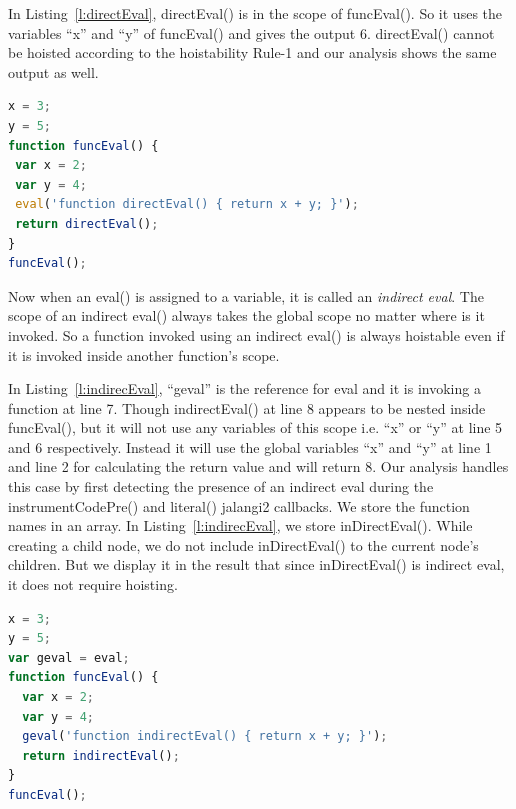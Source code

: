 \documentclass[authoryear,preprint]{sigplanconf}
\begin{document}
In Listing~\ref{l:directEval}, directEval() is in the scope of funcEval(). So it uses the variables \enquote{x} and \enquote{y} of funcEval() and gives the output 6.  directEval() cannot be hoisted according to the hoistability Rule-1 and our analysis shows the same output as well.

\lstset{numbers=left, numberstyle=\tiny, stepnumber=1, numbersep=5pt}
\lstset{basicstyle=\ttfamily}
\lstset{frame=tb, frame=bottomline}

\begin{lstlisting}[float,caption=Direct eval() ,label=l:directEval,language=JavaScript]
x = 3;
y = 5;
function funcEval() {
 var x = 2;
 var y = 4;
 eval('function directEval() { return x + y; }');
 return directEval();
}
funcEval();
\end{lstlisting}

Now when an eval() is assigned to a variable, it is called an \textit{indirect eval}. The scope of an indirect eval() always takes the global scope no matter where is it invoked. So a function invoked using an indirect eval() is always hoistable even if it is invoked inside another function's scope.\par

In Listing~\ref{l:indirecEval}, \enquote{geval} is the reference for eval and it is invoking a function at line 7. Though indirectEval() at line 8 appears to be nested inside funcEval(), but it will not use any variables of this scope i.e. \enquote{x} or \enquote{y} at line 5 and 6 respectively. Instead it will use the global variables \enquote{x} and \enquote{y} at line 1 and line 2 for calculating the return value and will return 8. Our analysis handles this case by first detecting the presence of an indirect eval during the instrumentCodePre() and literal() jalangi2 callbacks. We store the function names in an array. In Listing~\ref{l:indirecEval}, we store inDirectEval(). While creating a child node, we do not include inDirectEval() to the current node's children. But we display it in the result that since inDirectEval() is indirect eval, it does not require hoisting. 

\lstset{numbers=left, numberstyle=\tiny, stepnumber=1, numbersep=5pt}
\lstset{basicstyle=\ttfamily}
\lstset{frame=tb, frame=bottomline}

\begin{lstlisting}[float,caption=InDirect eval() ,label=l:indirecEval,language=JavaScript]
x = 3;
y = 5;
var geval = eval;
function funcEval() {
  var x = 2;
  var y = 4;
  geval('function indirectEval() { return x + y; }');
  return indirectEval();
}
funcEval();
\end{lstlisting}
\end{document}
